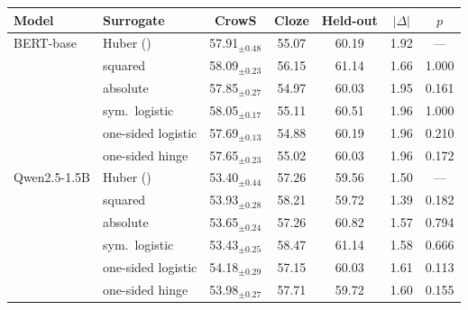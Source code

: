   \footnotesize\setlength{\tabcolsep}{4pt}
  \begin{tabular}{@{}llccccc@{}}
    \toprule
    Model & Surrogate & CrowS & Cloze & Held-out & $|\Delta|$ & $p$ \\
    \midrule
    BERT-base & Huber (\PEAT{}) & 57.91$_{\pm 0.48}$ & 55.07 & 60.19 & 1.92 & --- \\
     & squared & 58.09$_{\pm 0.23}$ & 56.15 & 61.14 & 1.66 & 1.000 \\
     & absolute & 57.85$_{\pm 0.27}$ & 54.97 & 60.03 & 1.95 & 0.161 \\
     & sym.\ logistic & 58.05$_{\pm 0.17}$ & 55.11 & 60.51 & 1.96 & 1.000 \\
     & one-sided logistic & 57.69$_{\pm 0.13}$ & 54.88 & 60.19 & 1.96 & 0.210 \\
     & one-sided hinge & 57.65$_{\pm 0.23}$ & 55.02 & 60.03 & 1.96 & 0.172 \\
    \midrule
    Qwen2.5-1.5B & Huber (\PEAT{}) & 53.40$_{\pm 0.44}$ & 57.26 & 59.56 & 1.50 & --- \\
     & squared & 53.93$_{\pm 0.28}$ & 58.21 & 59.72 & 1.39 & 0.182 \\
     & absolute & 53.65$_{\pm 0.24}$ & 57.26 & 60.82 & 1.57 & 0.794 \\
     & sym.\ logistic & 53.43$_{\pm 0.25}$ & 58.47 & 61.14 & 1.58 & 0.666 \\
     & one-sided logistic & 54.18$_{\pm 0.29}$ & 57.15 & 60.03 & 1.61 & 0.113 \\
     & one-sided hinge & 53.98$_{\pm 0.27}$ & 57.71 & 59.72 & 1.60 & 0.155 \\
    \bottomrule
  \end{tabular}
